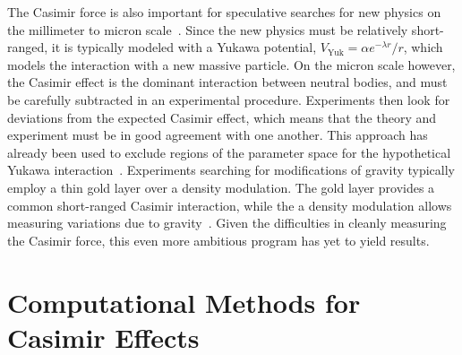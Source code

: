 The Casimir force is also important for speculative searches for new physics on the millimeter to micron
scale~\citep{Dimopoulos2003, Bezerra2011}.  Since the new physics must be relatively short-ranged, 
it is typically modeled with a Yukawa potential, $V_{\text{Yuk}}=\alpha e^{-\lambda r}/r$,
which models the interaction with a new massive particle.    
On the micron scale however, the Casimir effect is the dominant interaction between neutral bodies,
 and must be carefully subtracted in an experimental procedure.
 Experiments then look for deviations from the expected Casimir effect, which means that the 
theory and experiment must be in good agreement with one another.  
This approach has already been used to exclude regions of the parameter space for the hypothetical
Yukawa interaction~\citep{Obrecht2007,Bezerra2011}.  
Experiments searching for modifications of gravity typically employ a thin gold layer over
a density modulation.  The gold layer provides a common short-ranged Casimir interaction, while the 
a density modulation allows measuring variations due to gravity~\citep{Sorrentino2009, Geraci2015}.
Given the difficulties in cleanly measuring the Casimir force, this even more ambitious program has yet 
to yield results.  



\section{Computational Methods for Casimir Effects}
\label{sec:numerical_review}

